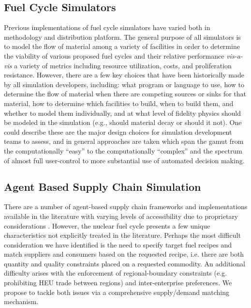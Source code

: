 \subsection{Fuel Cycle Simulators}

Previous implementations of fuel cycle simulators have varied both in
methodology and distribution platform. The general purpose of all simulators is
to model the flow of material among a variety of facilities in order to
determine the viability of various proposed fuel cycles and their relative
performance \textit{vis-a-vis} a variety of metrics including resource
utilization, costs, and proliferation resistance. However, there are a few key
choices that have been historically made by all simulation developers,
including: what program or language to use, how to determine the flow of
material when there are competing sources or sinks for that material, how to
determine which facilities to build, when to build them, and whether to model
them individually, and at what level of fidelity physics should be modeled in
the simulation (e.g., should material decay or should it not). One could
describe these are the major design choices for simulation development teams to
assess, and in general approaches are taken which span the gamut from the
computationally ``easy'' to the computationally ``complex'' and the spectrum of
almost full user-control to more substantial use of automated decision making.



\subsection{Agent Based Supply Chain Simulation}

There are a number of agent-based supply chain frameworks and implementations
available in the literature with varying levels of accessibility due to
proprietary
considerations \cite{swaminathan_modeling_1998,julka_agent-based_2002,van_der_zee_modeling_2005,chatfield_multi-formalism_2007}.
However, the nuclear fuel cycle presents a few unique characteristics not
explicitly treated in the literature. Perhaps the most difficult consideration
we have identified is the need to specify target fuel recipes and match
suppliers and consumers based on the requested recipe, i.e.  there are both
quantity and quality constraints placed on a requested commodity. An additional
difficulty arises with the enforcement of regional-boundary constraints
(e.g. prohibiting HEU trade between regions) and inter-enterprise
preferences. We propose to tackle both issues via a comprehensive supply/demand
matching mechanism.

